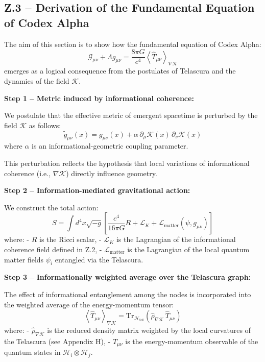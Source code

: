 \documentclass[12pt]{article}
\begin{document}
\subsection*{Z.3 – Derivation of the Fundamental Equation of Codex Alpha}

The aim of this section is to show how the fundamental equation of Codex Alpha:
\[
\mathcal{G}_{\mu\nu} + \Lambda g_{\mu\nu} = \frac{8\pi G}{c^4} \left\langle \hat{T}_{\mu\nu} \right\rangle_{\nabla \mathcal{K}}
\]
emerges as a logical consequence from the postulates of Telascura and the dynamics of the field $\mathcal{K}$.

\vspace{0.5em}
\textbf{Step 1 – Metric induced by informational coherence:}

We postulate that the effective metric of emergent spacetime is perturbed by the field $\mathcal{K}$ as follows:
\[
\tilde{g}_{\mu\nu}(x) = g_{\mu\nu}(x) + \alpha \, \partial_\mu \mathcal{K}(x) \, \partial_\nu \mathcal{K}(x)
\]
where $\alpha$ is an informational-geometric coupling parameter.

This perturbation reflects the hypothesis that local variations of informational coherence (i.e., $\nabla \mathcal{K}$) directly influence geometry.

\vspace{0.5em}
\textbf{Step 2 – Information-mediated gravitational action:}

We construct the total action:
\[
S = \int d^4x \sqrt{-g} \left[ \frac{c^4}{16\pi G} R + \mathcal{L}_{K} + \mathcal{L}_{\text{matter}}(\psi, g_{\mu\nu}) \right]
\]
where:
- $R$ is the Ricci scalar,
- $\mathcal{L}_{K}$ is the Lagrangian of the informational coherence field defined in Z.2,
- $\mathcal{L}_{\text{matter}}$ is the Lagrangian of the local quantum matter fields $\psi_i$ entangled via the Telascura.

\vspace{0.5em}
\textbf{Step 3 – Informationally weighted average over the Telascura graph:}

The effect of informational entanglement among the nodes is incorporated into the weighted average of the energy-momentum tensor:
\[
\left\langle \hat{T}_{\mu\nu} \right\rangle_{\nabla \mathcal{K}} = \text{Tr}_{\mathcal{H}_\text{tot}} \left( \hat{\rho}_{\nabla \mathcal{K}} \, \hat{T}_{\mu\nu} \right)
\]
where:
- $\hat{\rho}_{\nabla \mathcal{K}}$ is the reduced density matrix weighted by the local curvatures of the Telascura (see Appendix H),
- $\hat{T}_{\mu\nu}$ is the energy-momentum observable of the quantum states in $\mathcal{H}_i \otimes \mathcal{H}_j$.
\end{document}
